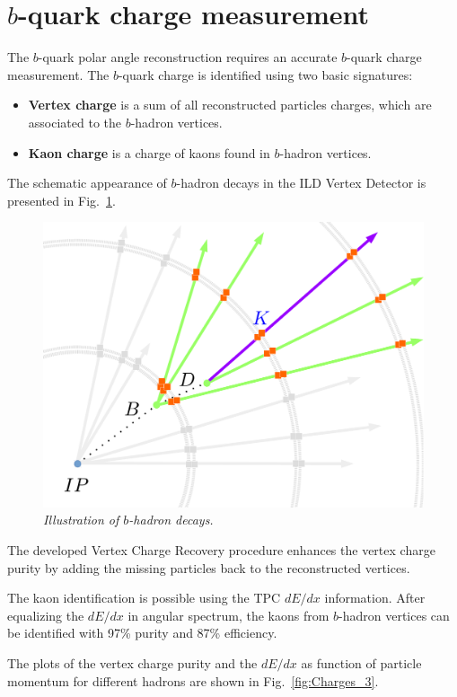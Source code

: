 \documentclass{PoS}
\begin{document}
\section{$b$-quark charge measurement}

The $b$-quark polar angle reconstruction requires an accurate $b$-quark charge measurement. 
The $b$-quark charge is identified using two basic signatures:
\begin{itemize}
	\item \textbf{Vertex charge} is a sum of all reconstructed particles charges, which are associated to the $b$-hadron vertices. 
	\item \textbf{Kaon charge} is a charge of kaons found in $b$-hadron vertices. 
\end{itemize}

The schematic appearance of $b$-hadron decays in the ILD Vertex Detector is presented in Fig.~\ref{fig:vtx}.

\begin{figure}
	{\centering
		\includegraphics[width=0.45\linewidth]{../poster/figures/vtx.pdf}
		\caption{\sl Illustration of $b$-hadron decays. }
		\label{fig:vtx}
	}
\end{figure}

The developed Vertex Charge Recovery procedure enhances the vertex charge purity by adding the missing particles back to the reconstructed vertices. 


The kaon identification is possible using the TPC $dE/dx$ information. After equalizing the $dE/dx$ in angular spectrum, the kaons from $b$-hadron vertices can be identified with 97\% purity and 87\% efficiency.

The plots of the vertex charge purity and the $dE/dx$ as function of particle momentum for different hadrons are shown in Fig.~\ref{fig:Charges_3}.
\end{document}
